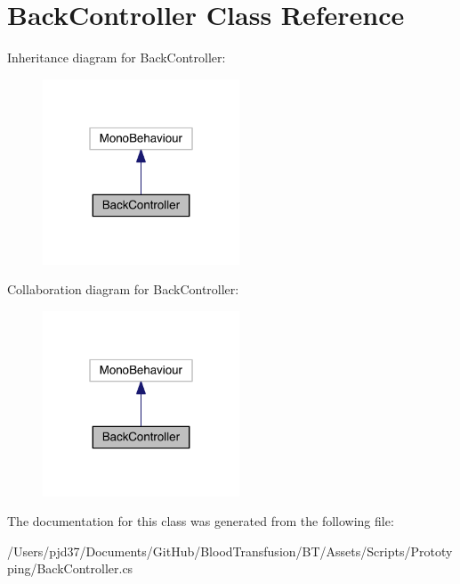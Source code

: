 \hypertarget{class_back_controller}{}\section{Back\+Controller Class Reference}
\label{class_back_controller}


Inheritance diagram for Back\+Controller\+:\nopagebreak
\begin{figure}[H]
\begin{center}
\leavevmode
\includegraphics[width=166pt]{class_back_controller__inherit__graph}
\end{center}
\end{figure}


Collaboration diagram for Back\+Controller\+:\nopagebreak
\begin{figure}[H]
\begin{center}
\leavevmode
\includegraphics[width=166pt]{class_back_controller__coll__graph}
\end{center}
\end{figure}


The documentation for this class was generated from the following file\+:\begin{DoxyCompactItemize}
\item 
/\+Users/pjd37/\+Documents/\+Git\+Hub/\+Blood\+Transfusion/\+B\+T/\+Assets/\+Scripts/\+Prototyping/Back\+Controller.\+cs\end{DoxyCompactItemize}
